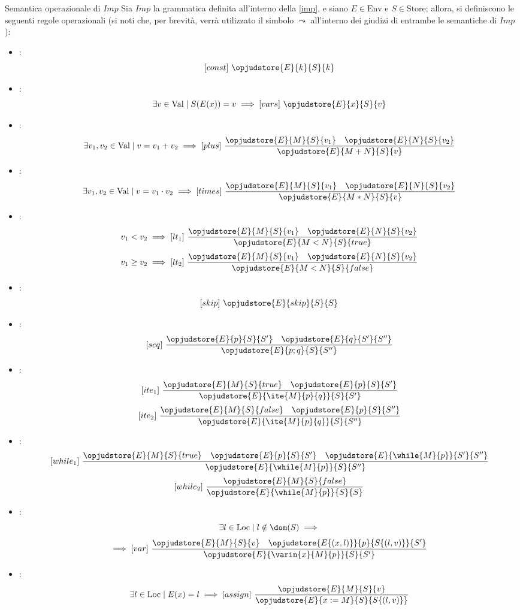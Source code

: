 \documentclass[a4paper, 12pt]{report}
\begin{document}
    \begin{framedprop}[label={imp sem},breakable]{Semantica operazionale di $Imp$}
        Sia $Imp$ la grammatica definita all'interno della \cref{imp}, e siano $E \in \mathrm{Env}$ e $S \in \mathrm{Store}$; allora, si definiscono le seguenti regole operazionali (si noti che, per brevità, verrà utilizzato il simbolo $\leadsto$ all'interno dei giudizi di entrambe le semantiche di $Imp$):

        \begin{itemize}
            \item {}: $$[const] \ \opjudstore{E}{k}{S}{k}$$
            \item {}: $$\exists v \in \mathrm{Val} \mid S(E(x)) = v \implies [vars] \ \opjudstore{E}{x}{S}{v}$$
            \item {}: $$\exists v_1, v_2 \in \mathrm{Val} \mid v = v_1 + v_2 \implies [plus] \ \dfrac{\opjudstore{E}{M}{S}{v_1} \quad \opjudstore{E}{N}{S}{v_2}}{\opjudstore{E}{M + N}{S}{v}}$$
            \item {}: $$\exists v_1, v_2 \in \mathrm{Val} \mid v = v_1 \cdot v_2 \implies [times] \ \dfrac{\opjudstore{E}{M}{S}{v_1} \quad \opjudstore{E}{N}{S}{v_2}}{\opjudstore{E}{M * N}{S}{v}}$$
            \item {}: $$v_1 < v_2 \implies [lt_1] \ \dfrac{\opjudstore{E}{M}{S}{v_1} \quad \opjudstore{E}{N}{S}{v_2}}{\opjudstore{E}{M  < N}{S}{true}}$$ $$v_1 \ge v_2 \implies [lt_2] \ \dfrac{\opjudstore{E}{M}{S}{v_1} \quad \opjudstore{E}{N}{S}{v_2}}{\opjudstore{E}{M  <  N}{S}{false}}$$
            \item {}: $$[skip] \ \opjudstore{E}{skip}{S}{S}$$
            \item {}: $$[seq] \ \dfrac{\opjudstore{E}{p}{ S}{S'} \quad \opjudstore{E}{q}{ S'}{S''}}{\opjudstore{E}{p;q}{S}{S''}}$$
            \item {}: $$[ite_1] \ \dfrac{\opjudstore{E}{M}{ S}{true} \quad \opjudstore{E}{p}{S}{S'}}{\opjudstore{E}{\ite{M}{p}{q}}{S}{S'}}$$ $$[ite_2] \ \dfrac{\opjudstore{E}{M}{S}{false} \quad \opjudstore{E}{p}{S}{S''}}{\opjudstore{E}{\ite{M}{p}{q}}{S}{S''}}$$
            \item {}: $$[while_1] \ \dfrac{\opjudstore{E}{M}{S}{true} \quad \opjudstore{E}{p}{S}{S'} \quad \opjudstore{E}{\while{M}{p}}{ S'}{S''}}{\opjudstore{E}{\while{M}{p}}{ S}{S''}}$$ $$[while_2] \ \dfrac{\opjudstore{E}{M}{S}{false}}{\opjudstore{E}{\while{M}{p}}{S}{S}}$$
            \item {}: $$\exists l \in \mathrm{Loc} \mid l \notin \dom(S) \implies$$ $$\implies [var] \ \dfrac{\opjudstore{E}{M}{S}{v} \quad \opjudstore{E\{(x,l)\}}{p}{S\{(l,v)\}}{S'}}{\opjudstore{E}{\varin{x}{M}{p}}{S}{S'}}$$
            \item {}: $$\exists l \in \mathrm{Loc} \mid E(x) = l \implies [assign] \ \dfrac{\opjudstore{E}{M}{S}{v}}{\opjudstore{E}{x := M}{ S}{S\{(l, v)\}}}$$
        \end{itemize}
    \end{framedprop}
\end{document}
